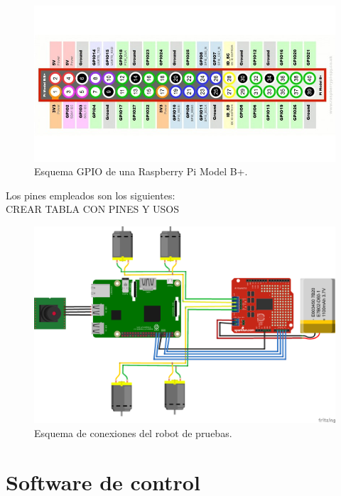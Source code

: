 \begin{figure}[H]
  \begin{center}
    \includegraphics[scale=0.4]{imagenes/robot/gpio-conexiones.jpg}
  \end{center}
  \caption{Esquema GPIO de una Raspberry Pi Model B+.}
  \label{gantt:tareas01}
\end{figure}

Los pines empleados son los siguientes:\\

CREAR TABLA CON PINES Y USOS



\begin{figure}[H]
  \begin{center}
    \includegraphics[scale=0.4]{imagenes/robot/robot-esquema.png}
  \end{center}
  \caption{Esquema de conexiones del robot de pruebas.}
  \label{gantt:tareas01}
\end{figure}


    
\section{Software de control}
  

